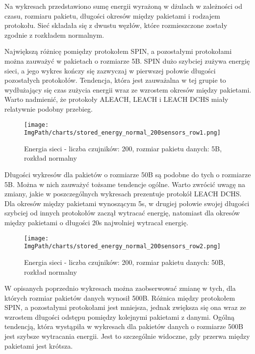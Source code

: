 Na wykresach przedstawiono sumę energii wyrażoną w dżulach w zależności od czasu, rozmiaru pakietu, długości okresów między pakietami i rodzajem protokołu. Sieć składała się z dwustu węzłów, które rozmieszczone zostały zgodnie z rozkładem normalnym.

Największą różnicę pomiędzy protokołem SPIN, a pozostałymi protokołami można zauważyć w pakietach o rozmiarze 5B. SPIN dużo szybciej zużywa energię sieci, a jego wykres kończy się zazwyczaj w pierwszej połowie długości pozostałych protokołów. Tendencja, która jest zauważalna w tej grupie to wydłużający się czas zużycia energii wraz ze wzrostem okresów między pakietami. Warto nadmienić, że protokoły ALEACH, LEACH i LEACH DCHS miały relatywnie podobny przebieg.

\begin{figure}[H]
	\begin{center}
		\texttt{[image: \\ImgPath/charts/stored\_energy\_normal\_200sensors\_row1.png]}
	\end{center}
	\caption{Energia sieci - liczba czujników: 200, rozmiar pakietu danych: 5B, rozkład normalny}
\end{figure}

Długości wykresów dla pakietów o rozmiarze 50B są podobne do tych o rozmiarze 5B. Można w nich zauważyć tożsame tendencje ogólne. Warto zwrócić uwagę na zmiany, jakie w poszczególnych wykresach prezentuje protokół LEACH DCHS. Dla okresów między pakietami wynoszącym 5s, w drugiej połowie swojej długości szybciej od innych protokołów zaczął wytracać energię, natomiast dla okresów między pakietami o długości 20s najwolniej wytracał energię.

\begin{figure}[H]
	\begin{center}
		\texttt{[image: \\ImgPath/charts/stored\_energy\_normal\_200sensors\_row2.png]}
	\end{center}
	\caption{Energia sieci - liczba czujników: 200, rozmiar pakietu danych: 50B, rozkład normalny}
\end{figure}

W opisanych poprzednio wykresach można zaobserwować zmianę w tych, dla których rozmiar pakietów danych wynosił 500B. Różnica między protokołem SPIN, a pozostałymi protokołami jest mniejsza, jednak zwiększa się ona wraz ze wzrostem długości odstępu pomiędzy kolejnymi pakietami z danymi. Ogólną tendencją, która wystąpiła w wykresach dla pakietów danych o rozmiarze 500B jest szybsze wytracania energii. Jest to szczególnie widoczne, gdy przerwa między pakietami jest krótsza.

